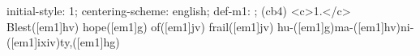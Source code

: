 initial-style: 1;
centering-scheme: english;
def-m1: \grealign;
(cb4) <c>1.</c> Blest([em1]hv) hope([em1]g) of([em1]jv) frail([em1]jv) hu-([em1]g)ma-([em1]hv)ni-([em1]ixiv)ty,([em1]hg)